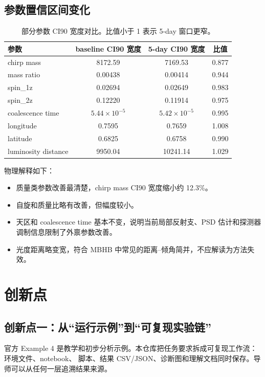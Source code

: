 \documentclass[11pt,a4paper]{ctexart}
\begin{document}
\subsection{参数置信区间变化}

\begin{table}[H]
\centering
\caption{部分参数 CI90 宽度对比。比值小于 1 表示 5-day 窗口更窄。}
\begin{tabular}{lccc}
\toprule
参数 & baseline CI90 宽度 & 5-day CI90 宽度 & 比值 \\
\midrule
chirp mass & 8172.59 & 7169.53 & 0.877 \\
mass ratio & 0.00438 & 0.00414 & 0.944 \\
spin\_1z & 0.02694 & 0.02649 & 0.983 \\
spin\_2z & 0.12220 & 0.11914 & 0.975 \\
coalescence time & \(5.44\times10^{-5}\) & \(5.42\times10^{-5}\) & 0.995 \\
longitude & 0.7595 & 0.7659 & 1.008 \\
latitude & 0.6825 & 0.6758 & 0.990 \\
luminosity distance & 9950.04 & 10241.14 & 1.029 \\
\bottomrule
\end{tabular}
\end{table}

物理解释如下：
\begin{itemize}
  \item 质量类参数改善最清楚，chirp mass CI90 宽度缩小约 12.3\%。
  \item 自旋和质量比略有改善，但幅度较小。
  \item 天区和 coalescence time 基本不变，说明当前局部反射支、PSD 估计和探测器调制信息限制了外禀参数改善。
  \item 光度距离略变宽，符合 MBHB 中常见的距离--倾角简并，不应解读为方法失效。
\end{itemize}

\section{创新点}

\subsection{创新点一：从“运行示例”到“可复现实验链”}

官方 Example 4 是教学和初步分析示例。本仓库把任务要求拆成可复现工作流：环境文件、notebook、
脚本、结果 CSV/JSON、诊断图和理解文档同时保存。导师可以从任何一层追溯结果来源。
\end{document}
